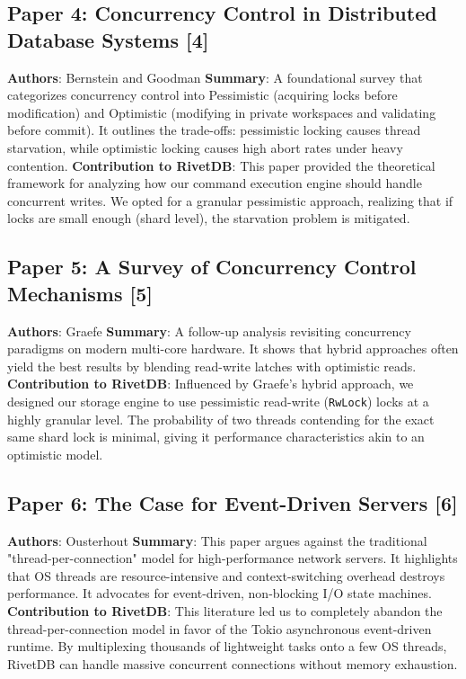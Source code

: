 \subsection{Paper 4: Concurrency Control in Distributed Database Systems [4]}
\textbf{Authors}: Bernstein and Goodman
\textbf{Summary}: A foundational survey that categorizes concurrency control into Pessimistic (acquiring locks before modification) and Optimistic (modifying in private workspaces and validating before commit). It outlines the trade-offs: pessimistic locking causes thread starvation, while optimistic locking causes high abort rates under heavy contention.
\textbf{Contribution to RivetDB}: This paper provided the theoretical framework for analyzing how our command execution engine should handle concurrent writes. We opted for a granular pessimistic approach, realizing that if locks are small enough (shard level), the starvation problem is mitigated.

\subsection{Paper 5: A Survey of Concurrency Control Mechanisms [5]}
\textbf{Authors}: Graefe
\textbf{Summary}: A follow-up analysis revisiting concurrency paradigms on modern multi-core hardware. It shows that hybrid approaches often yield the best results by blending read-write latches with optimistic reads.
\textbf{Contribution to RivetDB}: Influenced by Graefe's hybrid approach, we designed our storage engine to use pessimistic read-write (\texttt{RwLock}) locks at a highly granular level. The probability of two threads contending for the exact same shard lock is minimal, giving it performance characteristics akin to an optimistic model.

\subsection{Paper 6: The Case for Event-Driven Servers [6]}
\textbf{Authors}: Ousterhout
\textbf{Summary}: This paper argues against the traditional "thread-per-connection" model for high-performance network servers. It highlights that OS threads are resource-intensive and context-switching overhead destroys performance. It advocates for event-driven, non-blocking I/O state machines.
\textbf{Contribution to RivetDB}: This literature led us to completely abandon the thread-per-connection model in favor of the Tokio asynchronous event-driven runtime. By multiplexing thousands of lightweight tasks onto a few OS threads, RivetDB can handle massive concurrent connections without memory exhaustion.

